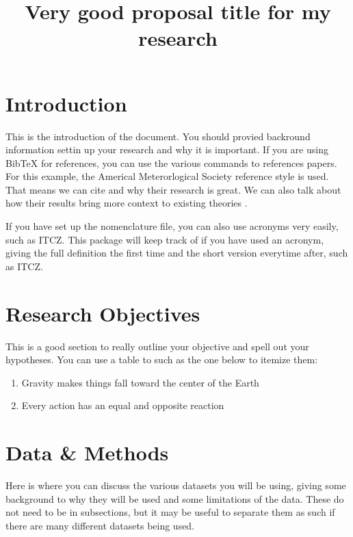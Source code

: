 \documentclass[oneside,letterpaper,12pt]{article}
\begin{document}
 

\title{Very good proposal title for my research} %

\doublespacing

\section{Introduction}

This is the introduction of the document.
You should provied backround information settin up your research and why it is important.
If you are using BibTeX for references, you can use the various commands to references papers.
For this example, the Americal Meterorlogical Society reference style is used.
That means we can cite \citet{Masunaga_etal:2005} and why their research is great.
We can also talk about how their results bring more context to existing theories \citep{Henderson_etal:2018}.

If you have set up the nomenclature file, you can also use acronyms very easily, such as \ac{ITCZ}.
This package will keep track of if you have used an acronym, giving the full definition the first time and the short version everytime after, such as \ac{ITCZ}.

\section{Research Objectives}
This is a good section to really outline your objective and spell out your hypotheses.
You can use a table to such as the one below to itemize them:

\begin{enumerate}[label=H\arabic*.]\bfseries
   \item Gravity makes things fall toward the center of the Earth
   \item Every action has an equal and opposite reaction
\end{enumerate}


\section{Data \& Methods}
Here is where you can discuss the various datasets you will be using, giving some background to why they will be used and some limitations of the data.
These do not need to be in subsections, but it may be useful to separate them as such if there are many different datasets being used.
\end{document}
